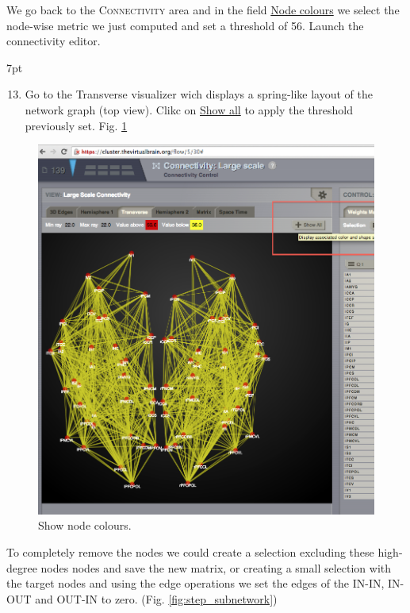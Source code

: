 \documentclass{tufte-handout}
\newenvironment{formal}{%
  \def\FrameCommand{%
    \hspace{1pt}%
    {\color{DarkBlue}\vrule width 2pt}%
    {\color{formalshade}\vrule width 4pt}%
    \colorbox{formalshade}%
  }%
  \MakeFramed{\advance\hsize-\width\FrameRestore}%
  \noindent\hspace{-4.55pt}%
  \begin{adjustwidth}{}{7pt}%
  \vspace{2pt}\vspace{2pt}%
}
{%
  \vspace{2pt}\end{adjustwidth}\endMakeFramed%
}
\begin{document}
\noindent We go back to the \textsc{Connectivity} area and in the field \underline{Node colours} we select
the node-wise metric we just computed and set a threshold of 56. Launch the connectivity editor.

\begin{formal}
  \begin{enumerate}[resume] %
  \setcounter{enumi}{12}
  \item Go to the Transverse visualizer wich displays a spring-like layout of the network graph (top view). Clikc on \underline{Show all} to apply the threshold previously set. Fig. \ref{fig:step_12}
  \end{enumerate}
\end{formal}

\begin{figure}[h]
  \includegraphics[width=0.9\linewidth]{Handout_UI_ModellingStructuralLesions_ShowColourNodes}%
  \caption{Show node colours.}%
  \label{fig:step_12}%
\end{figure}
\newpage

To completely remove the nodes we could create a selection excluding these
high-degree nodes nodes and save the new matrix, or creating a small selection
with the target nodes and using the edge operations we set the edges of the
IN-IN, IN-OUT and OUT-IN to zero. (Fig. \ref{fig:step_subnetwork})
\end{document}
